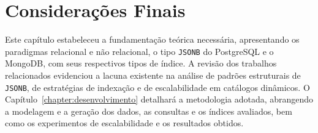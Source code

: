 \section{Considerações Finais}

Este capítulo estabeleceu a fundamentação teórica necessária, apresentando os paradigmas relacional e não relacional, o tipo \texttt{JSONB} do PostgreSQL e o MongoDB, com seus respectivos tipos de índice. A revisão dos trabalhos relacionados evidenciou a lacuna existente na análise de padrões estruturais de \texttt{JSONB}, de estratégias de indexação e de escalabilidade em catálogos dinâmicos. O Capítulo~\ref{chapter:desenvolvimento} detalhará a metodologia adotada, abrangendo a modelagem e a geração dos dados, as consultas e os índices avaliados, bem como os experimentos de escalabilidade e os resultados obtidos.
